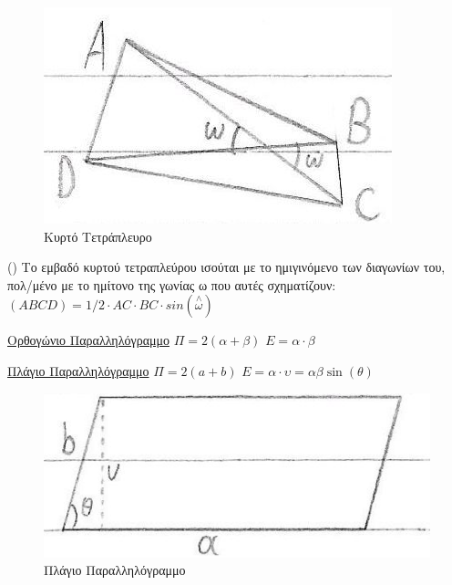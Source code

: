 \documentclass[12pt]{article}
\begin{document}
\begin{flushleft}
	\begin{figure}[ht]
	\centering
	\includegraphics[scale=2]{kirtoTetrapleuro}
	\caption{\textgreek{Κυρτό Τετράπλευρο}}
	\label{fig:kirtoTetrapleuro}
	\end{figure}
	
	\textbullet \quad () \textgreek{Το εμβαδό κυρτού τετραπλεύρου ισούται με το ημιγινόμενο των διαγωνίων του, πολ/μένο με το ημίτονο της γωνίας ω που αυτές σχηματίζουν: } $\displaystyle (ABCD) = 1/2 \cdot AC \cdot BC \cdot sin (\overset{\wedge}{\omega}) $ \linebreak 

	\uline{\textgreek{Ορθογώνιο Παραλληλόγραμμο}} \linebreak 
	\textbullet \quad $ \Pi = 2( \alpha + \beta) $ \linebreak 
	\textbullet \quad $ E= \alpha \cdot \beta $ \linebreak 
	
	\uline{\textgreek{Πλάγιο Παραλληλόγραμμο}} \linebreak 
	\textbullet \quad $ \Pi = 2(a+b) $ \linebreak 
	\textbullet \quad $\displaystyle  E = \alpha \cdot \upsilon = \alpha \beta \sin (\theta) $ \linebreak 
	
	\begin{figure}[ht]
	\centering
	\includegraphics[scale=2]{plagioParal}
	\caption{\textgreek{Πλάγιο Παραλληλόγραμμο}}
	\label{fig:plagioParal}
	\end{figure}
	

\end{flushleft}
\end{document}
